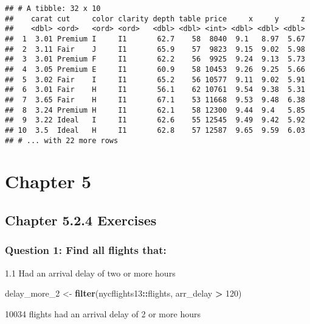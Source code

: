 \documentclass[
]{book}
\newenvironment{Shaded}{\begin{snugshade}}{\end{snugshade}}
\newcommand{\DecValTok}[1]{\textcolor[rgb]{0.00,0.00,0.81}{#1}}
\newcommand{\KeywordTok}[1]{\textcolor[rgb]{0.13,0.29,0.53}{\textbf{#1}}}
\newcommand{\NormalTok}[1]{#1}
\newcommand{\OperatorTok}[1]{\textcolor[rgb]{0.81,0.36,0.00}{\textbf{#1}}}
\newcommand{\StringTok}[1]{\textcolor[rgb]{0.31,0.60,0.02}{#1}}
\begin{document}
\begin{verbatim}
## # A tibble: 32 x 10
##    carat cut     color clarity depth table price     x     y     z
##    <dbl> <ord>   <ord> <ord>   <dbl> <dbl> <int> <dbl> <dbl> <dbl>
##  1  3.01 Premium I     I1       62.7    58  8040  9.1   8.97  5.67
##  2  3.11 Fair    J     I1       65.9    57  9823  9.15  9.02  5.98
##  3  3.01 Premium F     I1       62.2    56  9925  9.24  9.13  5.73
##  4  3.05 Premium E     I1       60.9    58 10453  9.26  9.25  5.66
##  5  3.02 Fair    I     I1       65.2    56 10577  9.11  9.02  5.91
##  6  3.01 Fair    H     I1       56.1    62 10761  9.54  9.38  5.31
##  7  3.65 Fair    H     I1       67.1    53 11668  9.53  9.48  6.38
##  8  3.24 Premium H     I1       62.1    58 12300  9.44  9.4   5.85
##  9  3.22 Ideal   I     I1       62.6    55 12545  9.49  9.42  5.92
## 10  3.5  Ideal   H     I1       62.8    57 12587  9.65  9.59  6.03
## # ... with 22 more rows
\end{verbatim}

\hypertarget{chapter-5}{%
\chapter{Chapter 5}\label{chapter-5}}

\hypertarget{chapter-5.2.4-exercises}{%
\section{Chapter 5.2.4 Exercises}\label{chapter-5.2.4-exercises}}

\hypertarget{question-1-find-all-flights-that}{%
\subsection{Question 1: Find all flights that:}\label{question-1-find-all-flights-that}}

1.1 Had an arrival delay of two or more hours

\begin{Shaded}
\begin{Highlighting}[]
\NormalTok{delay_more_}\DecValTok{2}\NormalTok{ <-}\StringTok{ }\KeywordTok{filter}\NormalTok{(nycflights13}\OperatorTok{::}\NormalTok{flights, arr_delay }\OperatorTok{>}\StringTok{ }\DecValTok{120}\NormalTok{)}
\end{Highlighting}
\end{Shaded}

10034 flights had an arrival delay of 2 or more hours
\end{document}
